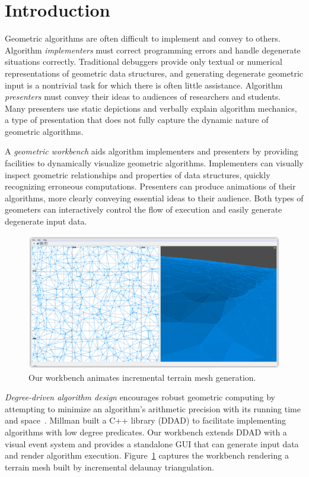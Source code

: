 \section{Introduction}

Geometric algorithms are often difficult to implement and convey to others.
Algorithm \emph{implementers} must correct programming errors and handle
degenerate situations correctly. Traditional debuggers provide only textual or
numerical representations of geometric data structures, and generating
degenerate geometric input is a nontrivial task for which there is often little
assistance. Algorithm \emph{presenters} must convey their ideas to audiences of
researchers and students. Many presenters use static depictions and verbally
explain algorithm mechanics, a type of presentation that does not fully capture
the dynamic nature of geometric algorithms.

A \emph{geometric workbench} aids algorithm implementers and presenters by
providing facilities to dynamically visualize geometric algorithms. Implementers
can visually inspect geometric relationships and properties of data structures,
quickly recognizing erroneous computations. Presenters can produce
animations of their algorithms, more clearly conveying essential
ideas to their audience. Both types of geometers can interactively control the
flow of execution and easily generate degenerate input data.

\begin{figure}[h]
	\centering
	\includegraphics[width=\textwidth]{figures/currentstate-2}
	\caption{Our workbench animates incremental terrain mesh generation.}
	\label{fig:currentstate}
\end{figure}

\emph{Degree-driven algorithm design} encourages robust geometric computing by
attempting to minimize an algorithm's arithmetic precision with its running time
and space~\cite{millman2012degree}. Millman built a C++ library (DDAD) to
facilitate implementing algorithms with low degree predicates. Our workbench
extends DDAD with a visual event system and provides a standalone GUI that can
generate input data and render algorithm execution.
Figure~\ref{fig:currentstate} captures the workbench rendering a terrain mesh
built by incremental delaunay triangulation.

